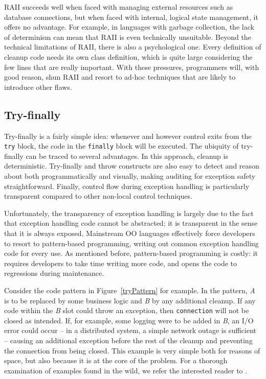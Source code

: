 \documentclass[11pt]{article}
\begin{document}
RAII succeeds well when faced with managing external resources such as database connections, but when faced with internal, logical state management, it offers no advantage.
For example, in languages with garbage collection, the lack of determinism can mean that RAII is even technically unsuitable.
Beyond the technical limitations of RAII, there is also a psychological one.
Every definition of cleanup code needs its own class definition, which is quite large considering the few lines that are really important.
With these pressures, programmers will, with good reason, shun RAII and resort to ad-hoc techniques that are likely to introduce other flaws.


\subsection{Try-finally}
\label{try-finally}

Try-finally is a fairly simple idea: whenever and however control exits from the \texttt{try} block, the code in the \texttt{finally} block will be executed.
The ubiquity of try-finally can be traced to several advantages.
In this approach, cleanup is deterministic.
Try-finally and throw constructs are also easy to detect and reason about both programmatically and visually, making auditing for exception safety straightforward.
Finally, control flow during exception handling is particularly transparent compared to other non-local control techniques.

Unfortunately, the transparency of exception handling is largely due to the fact that exception handling code cannot be abstracted;
it is transparent in the sense that it is always exposed.
Mainstream OO languages effectively force developers to resort to pattern-based programming, writing out common exception handling code for every use.
As mentioned before, pattern-based programming is costly: it requires developers to take time writing more code, and opens the code to regressions during maintenance.

Consider the code pattern in Figure~\ref{tryPattern} for example.
In the pattern, \textit{A} is to be replaced by some business logic and \textit{B} by any additional cleanup.
If any code within the \textit{B} slot could throw an exception, then \texttt{connection} will not be closed as intended.
If, for example, some logging were to be added in \textit{B}, an I/O error could occur -- in a distributed system, a simple network outage is sufficient -- causing an additional exception before the rest of the cleanup and preventing the connection from being closed.
This example is very simple both for reasons of space, but also because it is at the core of the problem.
For a thorough examination of examples found in the wild, we refer the interested reader to \cite{WeimerNecula08}.
\end{document}

